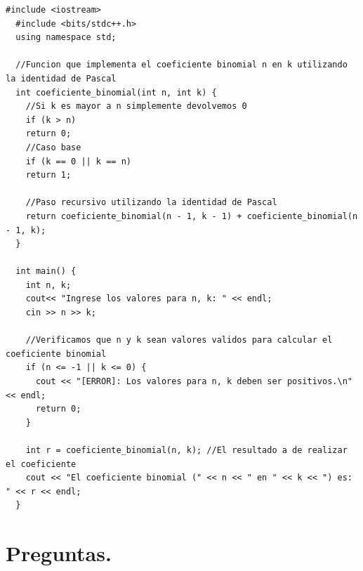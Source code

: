 \documentclass[12pt,letterpaper]{article}
\begin{document}
\begin{lstlisting}[style=cppstyle, caption={Código en C++ ~ Coeficiente binomial n en k utilizando la identidad de Pascal}]
  #include <iostream>
  #include <bits/stdc++.h>
  using namespace std;

  //Funcion que implementa el coeficiente binomial n en k utilizando la identidad de Pascal
  int coeficiente_binomial(int n, int k) {
    //Si k es mayor a n simplemente devolvemos 0
    if (k > n)
    return 0;
    //Caso base
    if (k == 0 || k == n)
    return 1;
    
    //Paso recursivo utilizando la identidad de Pascal
    return coeficiente_binomial(n - 1, k - 1) + coeficiente_binomial(n - 1, k);
  }

  int main() {
    int n, k;
    cout<< "Ingrese los valores para n, k: " << endl;
    cin >> n >> k;
    
    //Verificamos que n y k sean valores validos para calcular el coeficiente binomial
    if (n <= -1 || k <= 0) {
      cout << "[ERROR]: Los valores para n, k deben ser positivos.\n" << endl;
      return 0;
    }
    
    int r = coeficiente_binomial(n, k); //El resultado a de realizar el coeficiente
    cout << "El coeficiente binomial (" << n << " en " << k << ") es: " << r << endl;
  }

\end{lstlisting}

\newpage

\section*{Preguntas.}
\end{document}
